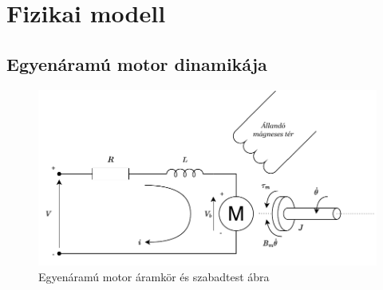 \chapter{Fizikai modell}\label{chap:physical_system}

\section{Egyenáramú motor dinamikája}

\begin{figure}[ht]
\begin{center}
\includegraphics[width=\textwidth]{images/dc_motor_model.pdf}
\caption{Egyenáramú motor áramkör és szabadtest ábra}
\label{fig:dc_motor}
\end{center}
\end{figure}

